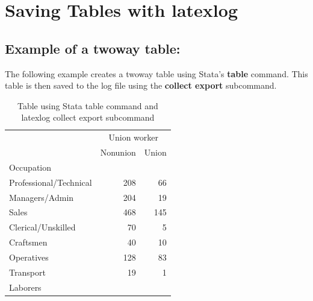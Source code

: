 \documentclass{article}
\begin{document}
\section{Saving Tables with latexlog}
\subsection{Example of a twoway table:}
The following example creates a twoway table using Stata's \textbf{table} command. 
This table is then saved to the log file using the \textbf{collect export} subcommand.
\begin{table}[htbp] 
\centering 
\begin{threeparttable} 
\caption{Table using Stata table command and latexlog collect export subcommand} 

\centering
\begin{tabular}{lll}
\toprule
\multicolumn{1}{c}{} &
  \multicolumn{2}{c}{Union worker} \\
\multicolumn{1}{c}{} &
  \multicolumn{1}{r}{Nonunion} &
  \multicolumn{1}{r}{Union} \\
\midrule
\multicolumn{1}{l}{Occupation} &
  \multicolumn{1}{r}{} &
  \multicolumn{1}{r}{} \\
\multicolumn{1}{l}{\hspace{1em}Professional/Technical} &
  \multicolumn{1}{r}{208} &
  \multicolumn{1}{r}{66} \\
\multicolumn{1}{l}{\hspace{1em}Managers/Admin} &
  \multicolumn{1}{r}{204} &
  \multicolumn{1}{r}{19} \\
\multicolumn{1}{l}{\hspace{1em}Sales} &
  \multicolumn{1}{r}{468} &
  \multicolumn{1}{r}{145} \\
\multicolumn{1}{l}{\hspace{1em}Clerical/Unskilled} &
  \multicolumn{1}{r}{70} &
  \multicolumn{1}{r}{5} \\
\multicolumn{1}{l}{\hspace{1em}Craftsmen} &
  \multicolumn{1}{r}{40} &
  \multicolumn{1}{r}{10} \\
\multicolumn{1}{l}{\hspace{1em}Operatives} &
  \multicolumn{1}{r}{128} &
  \multicolumn{1}{r}{83} \\
\multicolumn{1}{l}{\hspace{1em}Transport} &
  \multicolumn{1}{r}{19} &
  \multicolumn{1}{r}{1} \\
\multicolumn{1}{l}{\hspace{1em}Laborers} &

\end{tabular}
\end{threeparttable}
\end{table}
\end{document}
